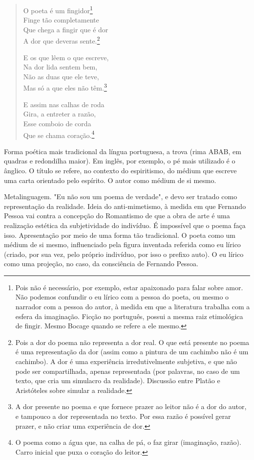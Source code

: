 \begin{verse}
O poeta é um fingidor\footnote{Pois não é necessário, por exemplo, estar apaixonado para falar sobre amor. Não podemos confundir o eu lírico com a pessoa do poeta, ou mesmo o narrador com a pessoa do autor, à medida em que a literatura trabalha com a esfera da imaginação. Ficção no português, possui a mesma raiz etimológica de fingir. Mesmo Bocage quando se refere a ele mesmo.} \\
Finge tão completamente \\
Que chega a fingir que é dor \\
A dor que deveras sente.\footnote{Pois a dor do poema não representa a dor real. O que está presente no poema é uma representação da dor (assim como a pintura de um cachimbo não é um cachimbo). A dor é uma experiência irredutivelmente subjetiva, e que não pode ser compartilhada, apenas representada (por palavras, no caso de um texto, que cria um simulacro da realidade). Discussão entre Platão e Aristóteles sobre simular a realidade.}

E os que lêem o que escreve, \\
Na dor lida sentem bem, \\
Não as duas que ele teve, \\
Mas só a que eles não têm.\footnote{A dor presente no poema e que fornece prazer ao leitor não é a dor do autor, e tampouco a dor representada no texto. Por essa razão é possível gerar prazer, e não criar uma experiência de dor.}

E assim nas calhas de roda \\
Gira, a entreter a razão, \\
Esse comboio de corda \\
Que se chama coração.\footnote{O poema como a água que, na calha de pá, o faz girar (imaginação, razão). Carro inicial que puxa o coração do leitor.}
\end{verse}

Forma poética mais tradicional da língua portuguesa, a trova (rima ABAB, em quadras e redondilha maior). Em inglês, por exemplo, o pé mais utilizado é o ânglico. O título se refere, no contexto do espiritismo, do médium que escreve uma carta orientado pelo espírito. O autor como médium de si mesmo.

Metalinguagem. "Eu não sou um poema de verdade", e devo ser tratado como representação da realidade. Ideia do anti-mimetismo, à medida em que Fernando Pessoa vai contra a concepção do Romantismo de que a obra de arte é uma realização estética da subjetividade do indivíduo. É impossível que o poema faça isso. Apresentação por meio de uma forma tão tradicional. O poeta como um médium de si mesmo, influenciado pela figura inventada referida como eu lírico (criado, por sua vez, pelo próprio indivíduo, por isso o prefixo auto). O eu lírico como uma projeção, no caso, da consciência de Fernando Pessoa.

